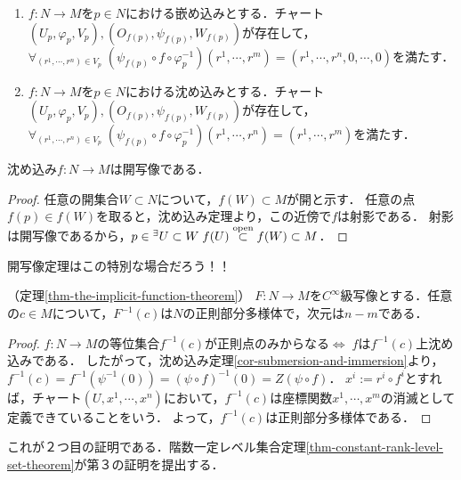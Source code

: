 \documentclass[uplatex,dvipdfmx]{jsreport}
\begin{document}
\begin{corollary}\mbox{}\label{cor-submersion-and-immersion}
    \begin{enumerate}
        \item $f:N\to M$を$p\in N$における嵌め込みとする．チャート$(U_p,\varphi_p,V_p),(O_{f(p)},\psi_{f(p)},W_{f(p)})$が存在して，$\forall_{(r^1,\cdots,r^n)\in V_p}\;(\psi_{f(p)}\circ f\circ\varphi_p^{-1})(r^1,\cdots,r^m)=(r^1,\cdots,r^n,0,\cdots,0)$を満たす．
        \item $f:N\to M$を$p\in N$における沈め込みとする．チャート$(U_p,\varphi_p,V_p),(O_{f(p)},\psi_{f(p)},W_{f(p)})$が存在して，$\forall_{(r^1,\cdots,r^n)\in V_p}\;(\psi_{f(p)}\circ f\circ\varphi_p^{-1})(r^1,\cdots,r^n)=(r^1,\cdots,r^m)$を満たす．
    \end{enumerate}
\end{corollary}

\begin{corollary}
    沈め込み$f:N\to M$は開写像である．
\end{corollary}
\begin{proof}
    任意の開集合$W\subset N$について，$f(W)\subset M$が開と示す．
    任意の点$f(p)\in f(W)$を取ると，沈め込み定理より，この近傍で$f$は射影である．
    射影は開写像であるから，$p\in{}^\exists U\subset W\;f(U)\overset{\mathrm{open}}{\subset} f(W)\subset M$．
\end{proof}
\begin{remarks}
    開写像定理はこの特別な場合だろう！！
\end{remarks}

\begin{corollary}（定理\ref{thm-the-implicit-function-theorem}）
    $F:N\to M$を$C^\infty$級写像とする．任意の$c\in M$について，$F^{-1}(c)$は$N$の正則部分多様体で，次元は$n-m$である．
\end{corollary}
\begin{proof}
    $f:N\to M$の等位集合$f^{-1}(c)$が正則点のみからなる$\Leftrightarrow\;f$は$f^{-1}(c)$上沈め込みである．
    したがって，沈め込み定理\ref{cor-submersion-and-immersion}より，$f^{-1}(c)=f^{-1}(\psi^{-1}(0))=(\psi\circ f)^{-1}(0)=Z(\psi\circ f)$．
    $x^i:=r^i\circ f^i$とすれば，チャート$(U,x^1,\cdots,x^n)$において，$f^{-1}(c)$は座標関数$x^1,\cdots,x^m$の消滅として定義できていることをいう．
    よって，$f^{-1}(c)$は正則部分多様体である．
\end{proof}
\begin{remarks}
    これが２つ目の証明である．階数一定レベル集合定理\ref{thm-constant-rank-level-set-theorem}が第３の証明を提出する．
\end{remarks}
\end{document}
